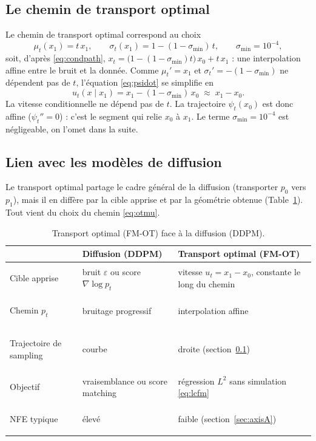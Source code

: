 \documentclass[11pt]{article}
\begin{document}
\subsection{Le chemin de transport optimal}
\label{sec:ot}

Le chemin de transport optimal correspond au choix
\begin{equation}
\mu_t(x_1) = t\,x_1, \qquad \sigma_t(x_1) = 1 - (1-\sigma_{\min})\,t, \qquad \sigma_{\min} = 10^{-4},
\label{eq:otmu}
\end{equation}
soit, d'après \eqref{eq:condpath}, $x_t = \big(1-(1-\sigma_{\min})t\big)\,x_0 + t\,x_1$ : une interpolation
affine entre le bruit et la donnée. Comme $\mu_t' = x_1$ et $\sigma_t' = -(1-\sigma_{\min})$ ne dépendent pas
de $t$, l'équation \eqref{eq:psidot} se simplifie en
\begin{equation}
u_t(x \mid x_1) = x_1 - (1-\sigma_{\min})\,x_0 \;\approx\; x_1 - x_0.
\label{eq:otfield}
\end{equation}
La vitesse conditionnelle ne dépend pas de $t$. La trajectoire $\psi_t(x_0)$ est donc affine
($\psi_t'' = 0$) : c'est le segment qui relie $x_0$ à $x_1$. Le terme $\sigma_{\min} = 10^{-4}$ est
négligeable, on l'omet dans la suite.

\subsection{Lien avec les modèles de diffusion}
\label{sec:vsddpm}

Le transport optimal partage le cadre général de la diffusion (transporter $p_0$ vers $p_1$), mais il en
diffère par la cible apprise et par la géométrie obtenue (Table~\ref{tab:vsddpm}). Tout vient du choix du
chemin \eqref{eq:otmu}.

\begin{table}[htbp]
\centering
\caption{Transport optimal (FM-OT) face à la diffusion (DDPM).}
\label{tab:vsddpm}
\begin{tabularx}{\textwidth}{>{\bfseries\raggedright\arraybackslash}p{3.2cm} X X}
\toprule
 & Diffusion (DDPM) & Transport optimal (FM-OT) \\
\midrule
Cible apprise          & bruit $\varepsilon$ ou score $\nabla\!\log p_t$ & vitesse $u_t = x_1 - x_0$, constante le long du chemin \\
Chemin $p_t$           & bruitage progressif & interpolation affine \\
Trajectoire de sampling & courbe & droite (section~\ref{sec:ot}) \\
Objectif               & vraisemblance ou score matching & régression $L^2$ sans simulation \eqref{eq:lcfm} \\
NFE typique            & élevé & faible (section~\ref{sec:axisA}) \\
\bottomrule
\end{tabularx}
\end{table}
\end{document}
